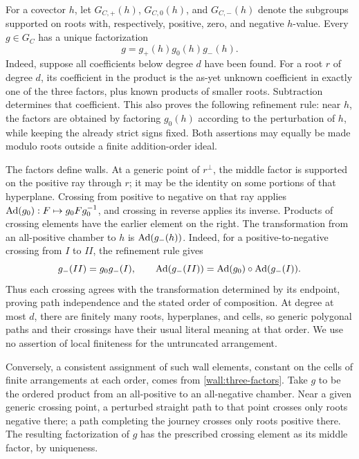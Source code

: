 For a covector $h$, let $G_{C,+}(h)$, $G_{C,0}(h)$, and $G_{C,-}(h)$
denote the subgroups supported on roots with, respectively, positive,
zero, and negative $h$-value.  Every $g\in G_C$ has a unique
factorization
\begin{equation}
 g=g_+(h)g_0(h)g_-(h).
 \label{wall:three-factors}
\end{equation}
Indeed, suppose all coefficients below degree $d$ have been found.
For a root $r$ of degree $d$, its coefficient in the product is the
as-yet unknown coefficient in exactly one of the three factors, plus
known products of smaller roots.  Subtraction determines that
coefficient.  This also proves the following refinement rule: near
$h$, the factors are obtained by factoring $g_0(h)$ according to the
perturbation of $h$, while keeping the already strict signs fixed.
Both assertions may equally be made modulo roots outside a finite
addition-order ideal.

The factors define walls.  At a generic point of $r^\perp$, the
middle factor is supported on the positive ray through $r$; it may
be the identity on some portions of that hyperplane.  Crossing from
positive to negative on that ray applies
$\operatorname{Ad}(g_0):F\mapsto g_0Fg_0^{-1}$, and crossing in reverse applies its
inverse.  Products of crossing elements have the earlier element on
the right.  The transformation from an all-positive chamber to $h$
is $\operatorname{Ad}(g_-(h))$. Indeed, for a positive-to-negative crossing from
$I$ to $II$, the refinement rule gives
\[
 g_-(II)=g_0g_-(I),\qquad
 \operatorname{Ad}(g_-(II))=\operatorname{Ad}(g_0)\circ\operatorname{Ad}(g_-(I)).
\]
Thus each crossing agrees with the transformation determined by its
endpoint, proving path independence and the stated order of composition.
At degree at most $d$, there are finitely many roots, hyperplanes,
and cells, so generic polygonal paths and their crossings have their
usual literal meaning at that order.  We use no assertion of local
finiteness for the untruncated arrangement.

Conversely, a consistent assignment of such wall elements, constant
on the cells of finite arrangements at each order, comes from
\eqref{wall:three-factors}.  Take $g$ to be the ordered product from
an all-positive to an all-negative chamber.  Near a given generic
crossing point, a perturbed straight path to that point crosses only
roots negative there; a path completing the journey crosses only
roots positive there.  The resulting factorization of $g$ has the
prescribed crossing element as its middle factor, by uniqueness.

